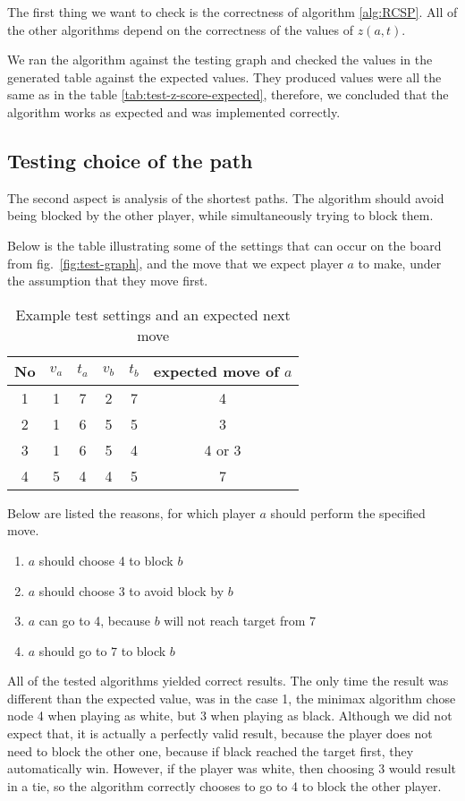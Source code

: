 \documentclass[12pt]{article}
\begin{document}
The first thing we want to check is the correctness of algorithm \ref{alg:RCSP}.
All of the other algorithms depend on the correctness of the values of $z(a,t)$.

We ran the algorithm against the testing graph and checked the values in the generated table against the expected values.
They produced values were all the same as in the table \ref{tab:test-z-score-expected},
therefore, we concluded that the algorithm works as expected and was implemented correctly.

\subsection{Testing choice of the path}

The second aspect is analysis of the shortest paths.
The algorithm should avoid being blocked by the other player,
while simultaneously trying to block them.

Below is the table illustrating some of the settings that can occur on the board from fig.~\ref{fig:test-graph},
and the move that we expect player $a$ to make, under the assumption that they move first.

\begin{table}[h]\centering
    \begin{tabular}{c|cccc|c}
        \toprule
        No & $v_a$ & $t_a$ & $v_b$ & $t_b$ & expected move of $a$ \\ \midrule
        1  & 1     & 7     & 2     & 7     & 4                    \\
        2  & 1     & 6     & 5     & 5     & 3                    \\
        3  & 1     & 6     & 5     & 4     & 4 or 3               \\
        4  & 5     & 4     & 4     & 5     & 7                    \\
        \bottomrule
    \end{tabular}
    \caption{Example test settings and an expected next move}
\end{table}

Below are listed the reasons, for which player $a$ should perform the specified move.
\begin{enumerate}
    \item $a$ should choose 4 to block $b$
    \item $a$ should choose 3 to avoid block by $b$
    \item $a$ can go to 4, because $b$ will not reach target from $7$
    \item $a$ should go to $7$ to block $b$
\end{enumerate}

All of the tested algorithms yielded correct results.
The only time the result was different than the expected value, was in the case 1,
the minimax algorithm chose node 4 when playing as white, but 3 when playing as black.
Although we did not expect that, it is actually a perfectly valid result,
because the player does not need to block the other one,
because if black reached the target first, they automatically win.
However, if the player was white, then choosing 3 would result in a tie, so the algorithm correctly chooses to go to 4 to block the other player.
\end{document}
